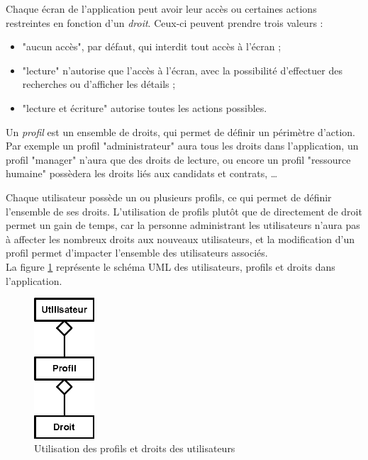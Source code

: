 Chaque écran de l'application peut avoir leur accès ou certaines actions restreintes en fonction d'un \textit{droit}.
Ceux-ci peuvent prendre trois valeurs : 
\begin{itemize}
	\item "aucun accès", par défaut, qui interdit tout accès à l'écran ;
	\item "lecture" n'autorise que l'accès à l'écran, avec la possibilité d'effectuer des recherches ou d'afficher les détails ;
	\item "lecture et écriture" autorise toutes les actions possibles.
\end{itemize}

Un \textit{profil} est un ensemble de droits, qui permet de définir un périmètre d'action.
Par exemple un profil "administrateur" aura tous les droits dans l'application, un profil "manager" n'aura que des droits de lecture, ou encore un profil "ressource humaine" possèdera les droits liés aux candidats et contrats, \ldots

Chaque utilisateur possède un ou plusieurs profils, ce qui permet de définir l'ensemble de ses droits.
L'utilisation de profils plutôt que de directement de droit permet un gain de temps, car la personne administrant les utilisateurs n'aura pas à affecter les nombreux droits aux nouveaux utilisateurs, et la modification d'un profil permet d'impacter l'ensemble des utilisateurs associés.
\\

La figure \ref{utilisateur_profils_droits} représente le schéma UML des utilisateurs, profils et droits dans l'application.
\begin{figure}[!h]
	\center
	\includegraphics[width=0.2\textwidth]{img/utilisateur_profils_droits.png}
	\caption{Utilisation des profils et droits des utilisateurs}
	\label{utilisateur_profils_droits}
\end{figure}

